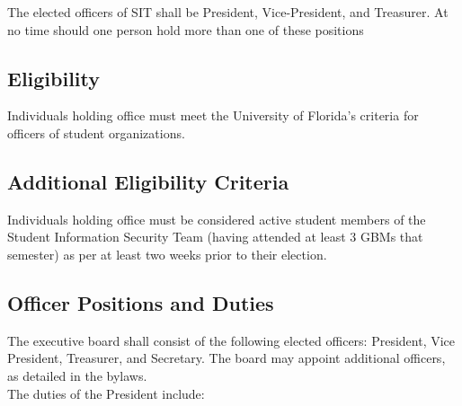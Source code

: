 \documentclass{article}
\def\clubname{SIT }
\def\clubfullname{Student Information Security Team }
\begin{document}
The elected officers of \clubname shall be President, Vice-President, and Treasurer. At no time should one person hold more than one of these positions

\subsection{Eligibility}
Individuals holding office must meet the University of Florida’s criteria for officers of student organizations.

\subsection{Additional Eligibility Criteria}
Individuals holding office must be considered active student members of the \clubfullname (having attended at least 3 GBMs that semester) as per at least two weeks prior to their election.

\subsection{Officer Positions and Duties}

The executive board shall consist of the following elected officers: President, Vice President, Treasurer, and Secretary. The board may appoint additional officers, as detailed in the bylaws. \\

\noindent
The duties of the President include:
\end{document}

